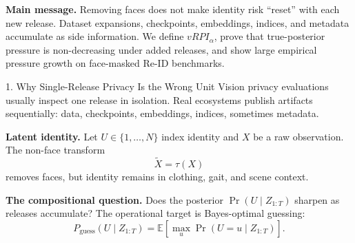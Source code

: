 \documentclass[final]{article}
\newcommand{\fsBody}{\fontsize{25}{29}}   %
\newcommand{\smallbody}{\fsBody\selectfont}
\newcommand{\mhead}[1]{\textbf{\color{navy}#1}}
\begin{document}
\begin{minipage}[t]{\textwidth}
\vspace{0.0794in}
\begin{claimbox}
\centering
\fsBody\selectfont
\textbf{Main message.} Removing faces does not make identity risk ``reset'' with each new release. Dataset expansions, checkpoints, embeddings, indices, and metadata accumulate as side information. We define \textbf{$vRPI_\alpha$}, prove that true-posterior pressure is non-decreasing under added releases, and show large empirical pressure growth on face-masked Re-ID benchmarks.
\end{claimbox}
\vspace{0.05in}

\begin{minipage}[t]{0.292\textwidth}
\vspace{0pt}

\begin{sectionbox}{1. Why Single-Release Privacy Is the Wrong Unit}
\smallbody
Vision privacy evaluations usually inspect one release in isolation. Real ecosystems publish artifacts sequentially: data, checkpoints, embeddings, indices, sometimes metadata.

\vspace{0.0397in}
\mhead{Latent identity.} Let $U\in\{1,\dots,N\}$ index identity and $X$ be a raw observation. The non-face transform
\[
\widetilde X=\tau(X)
\]
removes faces, but identity remains in clothing, gait, and scene context.

\vspace{0.0238in}
\mhead{The compositional question.} Does the posterior $\Pr(U\mid Z_{1:T})$ sharpen as releases accumulate? The operational target is Bayes-optimal guessing:
\[
P_{\mathrm{guess}}(U\mid Z_{1:T})
=\mathbb E\!\left[\max_u \Pr(U=u\mid Z_{1:T})\right].
\]


\end{sectionbox}
\end{minipage}
\end{minipage}
\end{document}

